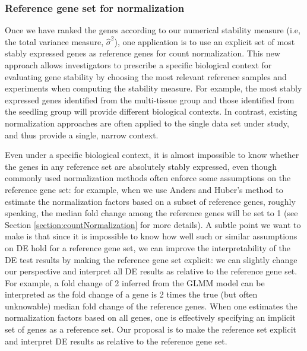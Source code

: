			
			\subsubsection{Reference gene set for normalization}
			\label{Section:commonReference}
			
			Once we have ranked the genes according to our numerical stability measure
			(i.e, the total variance measure, $\hat\sigma^2$), one application is to use
			an explicit set of most stably expressed genes as reference genes for count
			normalization.  This new approach allows investigators to prescribe a specific
			biological context for evaluating gene stability by choosing the most relevant
			reference samples and experiments when computing the stability measure.  For
			example, the most stably expressed genes identified from the multi-tissue
			group and those identified from the seedling group will provide different
			biological contexts. In contrast, existing normalization approaches are often
			applied to the single data set under study, and thus provide a single, narrow
			context.
			
			
			Even under a specific biological context,  it is almost impossible to know
			whether the genes in any reference set are absolutely stably expressed, even
			though commonly used normalization methods often enforce some assumptions on
			the reference gene set: for example, when we use Anders and Huber's
			method to estimate the normalization factors based on a subset of reference
			genes, roughly speaking, the median fold change among the reference genes will
			be set to 1 (see Section \ref{section:countNormalization} for more details). A
			subtle point we want to make is that since it is impossible to know how well
			such or similar assumptions on DE hold for a reference gene set,
			we can improve the interpretability of the DE test results by making the
			reference gene set explicit:  we can slightly change our perspective and
			interpret all DE results as relative to the reference gene set.  
			For example, a fold change of 2 inferred from the GLMM model can be
			interpreted as the fold change of a gene is 2 times the true (but often
			unknowable) median fold change of the reference genes.  
			When one estimates the normalization factors based on all genes, one is
			effectively specifying an implicit set of genes as a reference set.  Our
			proposal is to make the reference set explicit and interpret DE results as
			relative to the reference gene set.
			

